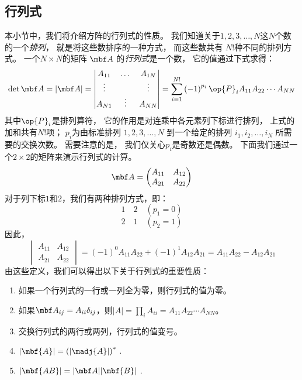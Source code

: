 \subsection{行列式}
\label{sec:1.1.3}
本小节中，我们将介绍方阵的行列式的性质。
我们知道关于$1, 2, 3, \dots, N$这$N$个数的一个\emph{排列}，
就是将这些数排序的一种方式，
而这些数共有 $N!$种不同的排列方式。
一个$N\times N$的矩阵 $\mbf A$ 的\emph{行列式}是一个数，
它的值通过下式求得：
\begin{equation}
 \det{\mbf A} = \vert {\mbf A} \vert = \begin{vmatrix}
     A_{11} &\dots &A_{1N} \\ \vdots & &\vdots \\ A_{N1} &\vdots &A_{NN} 
 \end{vmatrix} = \sum_{i=1}^{N!} \left(-1\right)^{p_i}\op{P}_iA_{11}A_{22}\cdots A_{NN}
 \label{eq:1.38}
\end{equation}
其中$\op{P}_i$是排列算符，
它的作用是对连乘中各元素列下标进行排列，
上式的加和共有$N!$项；
$p_i$为由标准排列 $1, 2, 3, \dots, N$ 到一个给定的排列 $i_1, i_2, \dots, i_N$ 所需要的交换次数。
需要注意的是，
我们仅关心$p_i$是奇数还是偶数。
下面我们通过一个$2 \times 2$的矩阵来演示行列式的计算。
\[{\mbf A} = \begin{pmatrix}
 A_{11} & A_{12} \\ A_{21} & A_{22}
\end{pmatrix}\]
对于列下标$1$和$2$，我们有两种排列方式，即：
\[
1 \quad 2 \quad \left(p_1 = 0\right)\]\[
2 \quad 1 \quad \left(p_2 = 1\right)\]
因此，
\begin{equation}
 \begin{vmatrix}
     A_{11} & A_{12} \\ A_{21} &A_{22}
 \end{vmatrix} = \left(-1\right)^0 A_{11}A_{22} + \left(-1\right)^1 A_{12}A_{21} = A_{11}A_{22} - A_{12}A_{21}
 \label{eq:1.39}
\end{equation}
由这些定义，我们可以得出以下关于行列式的重要性质：
\begin{enumerate}
 \item 如果一个行列式的一行或一列全为零，则行列式的值为零。
 \item 如果${\mbf A}_{ij} = A_{ii}\delta_{ij}$，则$\vert A\vert = \prod_i A_{ii} = A_{11}A_{22}\cdots A_{NN}$。
 \item 交换行列式的两行或两列，行列式的值变号。
 \item $\vert \mbf{A} \vert = \left(\vert\madj{A}\vert\right)^\ast$ .
 \item $\vert {\mbf{AB}}\vert = \vert{\mbf A}\vert\vert\mbf{B}\vert$ .
\end{enumerate}

